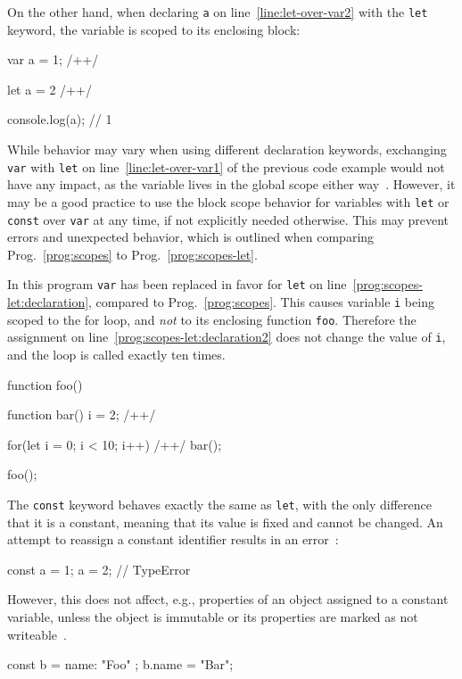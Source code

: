 \noindent
On the other hand, when declaring \texttt{a} on line~\ref{line:let-over-var2} with the \texttt{let} keyword, the variable is scoped to its enclosing block:
\begin{JsCode}
var a = 1; /+\label{line:let-over-var1}+/

{
  let a = 2 /+\label{line:let-over-var2}+/
}

console.log(a); // 1
\end{JsCode}
While behavior may vary when using different declaration keywords, exchanging \texttt{var} with \texttt{let} on line~\ref{line:let-over-var1} of the previous code example would not have any impact, as the variable lives in the global scope either way~\cites{variable-scope:Microsoft:2017, var:MDN:2017}. However, it may be a good practice to use the block scope behavior for variables with \texttt{let} or \texttt{const} over \texttt{var} at any time, if not explicitly needed otherwise. This may prevent errors and unexpected behavior, which is outlined when comparing Prog.~\ref{prog:scopes} to Prog.~\ref{prog:scopes-let}.
\begin{program}[h]
\caption{In this program \texttt{var} has been replaced in favor for \texttt{let} on line~\ref{prog:scopes-let:declaration}, compared to Prog.~\ref{prog:scopes}. This causes variable \texttt{i} being scoped to the for loop, and \emph{not} to its enclosing function \texttt{foo}. Therefore the assignment on line~\ref{prog:scopes-let:declaration2} does not change the value of \texttt{i}, and the loop is called exactly ten times.}
\label{prog:scopes-let}
\begin{JsCode}
function foo() {

  function bar() {
    i = 2; /+\label{prog:scopes-let:declaration2}+/
  }
  
  for(let i = 0; i < 10; i++) { /+\label{prog:scopes-let:declaration}+/
    bar();
  }
  
}

foo();
\end{JsCode}
\end{program}

\noindent
The \texttt{const} keyword behaves exactly the same as \texttt{let}, with the only difference that it is a constant, meaning that its value is fixed and cannot be changed. An attempt to reassign a constant identifier results in an error~\cite[p.~39]{YDKJS:ScopesAndClosures:Simpson:2014}:
\begin{JsCode}[numbers=none]
const a = 1;
a = 2; // TypeError
\end{JsCode}
However, this does not affect, e.g., properties of an object assigned to a constant variable, unless the object is immutable or its properties are marked as not writeable~\cite{const:MDN:2017}.
\begin{JsCode}[numbers=none]
const b = { name: "Foo" };
b.name = "Bar";
\end{JsCode}


